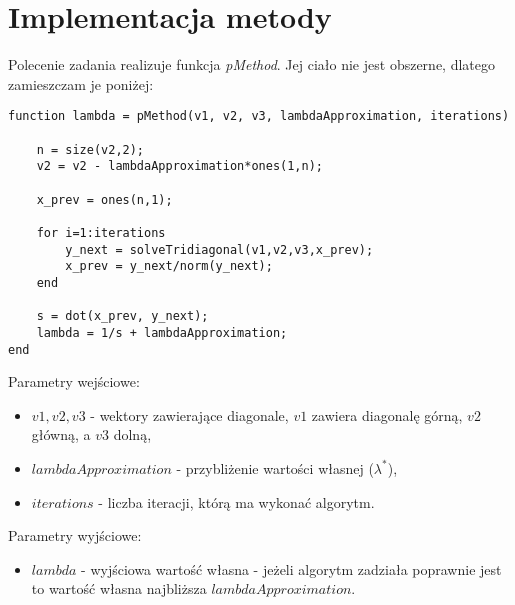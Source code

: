 \documentclass{article}
\begin{document}
\section{Implementacja metody}
Polecenie zadania realizuje funkcja \textit{pMethod}. Jej ciało nie jest obszerne, dlatego zamieszczam je poniżej:
\begin{lstlisting}[style=Matlab-editor]
function lambda = pMethod(v1, v2, v3, lambdaApproximation, iterations)

	n = size(v2,2);
	v2 = v2 - lambdaApproximation*ones(1,n);

	x_prev = ones(n,1);

	for i=1:iterations
    	y_next = solveTridiagonal(v1,v2,v3,x_prev);
    	x_prev = y_next/norm(y_next);
	end

	s = dot(x_prev, y_next);
	lambda = 1/s + lambdaApproximation;
end
\end{lstlisting}
\vspace{4pt}
Parametry wejściowe:
\begin{itemize}
\item $v1, v2, v3$ - wektory zawierające diagonale, $v1$ zawiera diagonalę górną, $v2$ główną, a $v3$ dolną,
\item $lambdaApproximation$ - przybliżenie wartości własnej ($\lambda^*$),
\item $iterations$ - liczba iteracji, którą ma wykonać algorytm.
\end{itemize}
Parametry wyjściowe:
\begin{itemize}
\item $lambda$ - wyjściowa wartość własna - jeżeli algorytm zadziała poprawnie jest to wartość własna najbliższa $lambdaApproximation$.
\end{itemize}
\end{document}
